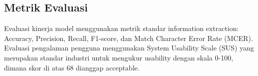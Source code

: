 \subsection{Metrik Evaluasi}
Evaluasi kinerja model menggunakan metrik standar information extraction: Accuracy, Precision, Recall, F1-score, dan Match Character Error Rate (MCER). Evaluasi pengalaman pengguna menggunakan System Usability Scale (SUS) yang merupakan standar industri untuk mengukur usability dengan skala 0-100, dimana skor di atas 68 dianggap acceptable.